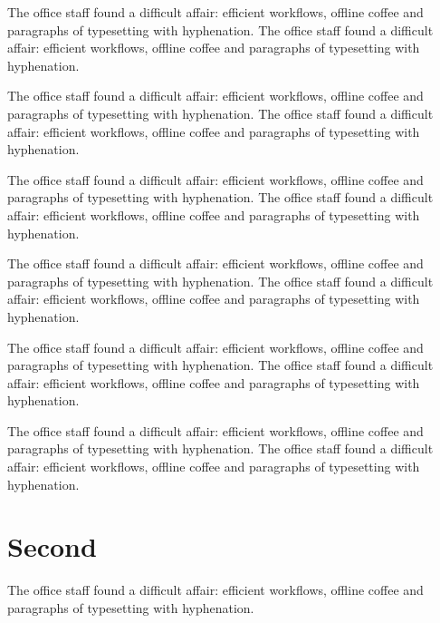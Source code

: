 \documentclass[11pt]{article}
\begin{document}
The office staff found a difficult affair: efficient workflows, offline coffee and paragraphs of typesetting with hyphenation. The office staff found a difficult affair: efficient workflows, offline coffee and paragraphs of typesetting with hyphenation.

The office staff found a difficult affair: efficient workflows, offline coffee and paragraphs of typesetting with hyphenation. The office staff found a difficult affair: efficient workflows, offline coffee and paragraphs of typesetting with hyphenation.

The office staff found a difficult affair: efficient workflows, offline coffee and paragraphs of typesetting with hyphenation. The office staff found a difficult affair: efficient workflows, offline coffee and paragraphs of typesetting with hyphenation.

The office staff found a difficult affair: efficient workflows, offline coffee and paragraphs of typesetting with hyphenation. The office staff found a difficult affair: efficient workflows, offline coffee and paragraphs of typesetting with hyphenation.

The office staff found a difficult affair: efficient workflows, offline coffee and paragraphs of typesetting with hyphenation. The office staff found a difficult affair: efficient workflows, offline coffee and paragraphs of typesetting with hyphenation.

The office staff found a difficult affair: efficient workflows, offline coffee and paragraphs of typesetting with hyphenation. The office staff found a difficult affair: efficient workflows, offline coffee and paragraphs of typesetting with hyphenation.

\section{Second}\label{sec:second}
The office staff found a difficult affair: efficient workflows, offline coffee and paragraphs of typesetting with hyphenation.
\end{document}
